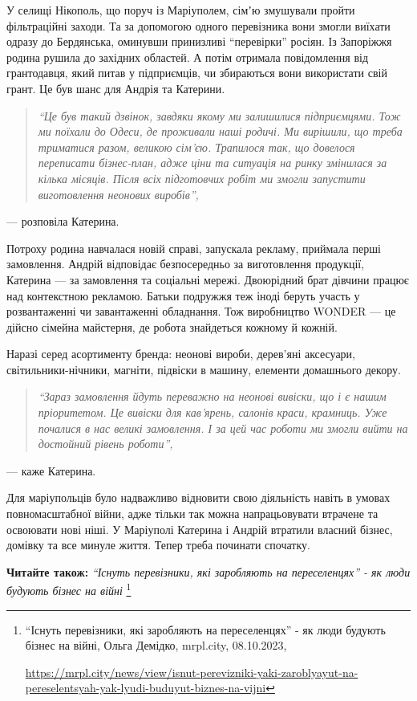 У селищі Нікополь, що поруч із Маріуполем, сімʼю змушували пройти фільтраційні
заходи. Та за допомогою одного перевізника вони змогли виїхати одразу до
Бердянська, оминувши принизливі \enquote{перевірки} росіян. Із Запоріжжя родина рушила
до західних областей. А потім отримала повідомлення від грантодавця, який питав
у підприємців, чи збираються вони використати свій грант. Це був шанс для
Андрія та Катерини.

\begin{quote}
\em\enquote{Це був такий дзвінок, завдяки якому ми залишилися підприємцями. Тож ми поїхали
до Одеси, де проживали наші родичі. Ми вирішили, що треба триматися разом,
великою сім'єю. Трапилося так, що довелося переписати бізнес-план, адже ціни та
ситуація на ринку змінилася за кілька місяців. Після всіх підготовчих робіт ми
змогли запустити виготовлення неонових виробів}, 
\end{quote}

— розповіла Катерина.

Потроху родина навчалася новій справі, запускала рекламу, приймала перші
замовлення. Андрій відповідає безпосередньо за виготовлення продукції, Катерина
— за замовлення та соціальні мережі. Двоюрідний брат дівчини працює над
контекстною рекламою. Батьки подружжя теж іноді беруть участь у розвантаженні
чи завантаженні обладнання. Тож виробництво WONDER — це дійсно сімейна
майстерня, де робота знайдеться кожному й кожній.

Наразі серед асортименту бренда: неонові вироби, дерев'яні аксесуари,
світильники-нічники, магніти, підвіски в машину, елементи домашнього декору.

\begin{quote}
\em\enquote{Зараз замовлення йдуть переважно на неонові вивіски, що і є нашим пріоритетом.
Це вивіски для кав'ярень, салонів краси, крамниць. Уже почалися в нас великі
замовлення. І за цей час роботи ми змогли вийти на достойний рівень роботи}, 
\end{quote}
— каже Катерина.


Для маріупольців було надважливо відновити свою діяльність навіть в умовах
повномасштабної війни, адже тільки так можна напрацьовувати втрачене та
освоювати нові ніші. У Маріуполі Катерина і Андрій втратили власний бізнес,
домівку та все минуле життя. Тепер треба починати спочатку.

\textbf{Читайте також:} \emph{\enquote{Існуть перевізники, які заробляють на переселенцях} - як люди будують бізнес на війні}%
\footnote{\enquote{Існуть перевізники, які заробляють на переселенцях} - як люди будують бізнес на війні, Ольга Демідко, %
mrpl.city, 08.10.2023, \par%
\url{https://mrpl.city/news/view/isnut-perevizniki-yaki-zaroblyayut-na-pereselentsyah-yak-lyudi-buduyut-biznes-na-vijni}
}

